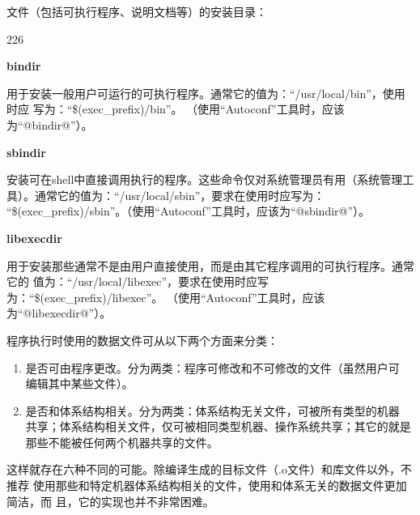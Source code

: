 文件（包括可执行程序、说明文档等）的安装目录：

\begin{dinglist}{226}
\itemsep=4pt \parskip=0pt

\item \textbf{bindir}

用于安装一般用户可运行的可执行程序。通常它的值为：“/usr/local/bin”，使用时应
写为：“\$(exec\_prefix)/bin”。 （使用“Autoconf”工具时，应该为“@bindir@”）。

\item \textbf{sbindir}

安装可在shell中直接调用执行的程序。这些命令仅对系统管理员有用（系统管理工
具）。通常它的值为：“/usr/local/sbin”，要求在使用时应写为：
“\$(exec\_prefix)/sbin”。（使用“Autoconf”工具时，应该为“@sbindir@”）。

\item \textbf{libexecdir}

用于安装那些通常不是由用户直接使用，而是由其它程序调用的可执行程序。通常它的
值为：“/usr/local/libexec”，要求在使用时应写为：“\$(exec\_prefix)/libexec”。
（使用“Autoconf”工具时，应该为“@libexecdir@”）。

\end{dinglist}

程序执行时使用的数据文件可从以下两个方面来分类：

\begin{enumerate}
  \item 是否可由程序更改。分为两类：程序可修改和不可修改的文件（虽然用户可
      编辑其中某些文件）。
  \item 是否和体系结构相关。分为两类：体系结构无关文件，可被所有类型的机器
      共享；体系结构相关文件，仅可被相同类型机器、操作系统共享；其它的就是
      那些不能被任何两个机器共享的文件。
\end{enumerate}

这样就存在六种不同的可能。除编译生成的目标文件（.o文件）和库文件以外，不推荐
使用那些和特定机器体系结构相关的文件，使用和体系无关的数据文件更加简洁，而
且，它的实现也并不非常困难。

